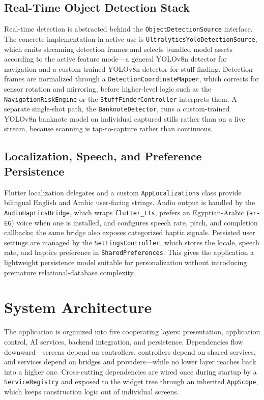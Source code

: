 \documentclass[12pt,a4paper]{report}
\begin{document}
\subsection{Real-Time Object Detection Stack}
Real-time detection is abstracted behind the \texttt{ObjectDetectionSource} interface. The concrete implementation in active use is \texttt{UltralyticsYoloDetectionSource}, which emits streaming detection frames and selects bundled model assets according to the active feature mode---a general YOLOv8n detector for navigation and a custom-trained YOLOv8n detector for stuff finding. Detection frames are normalized through a \texttt{DetectionCoordinateMapper}, which corrects for sensor rotation and mirroring, before higher-level logic such as the \texttt{NavigationRiskEngine} or the \texttt{StuffFinderController} interprets them. A separate single-shot path, the \texttt{BanknoteDetector}, runs a custom-trained YOLOv8n banknote model on individual captured stills rather than on a live stream, because scanning is tap-to-capture rather than continuous.

\subsection{Localization, Speech, and Preference Persistence}
Flutter localization delegates and a custom \texttt{AppLocalizations} class provide bilingual English and Arabic user-facing strings. Audio output is handled by the \texttt{AudioHapticsBridge}, which wraps \texttt{flutter\_tts}, prefers an Egyptian-Arabic (\texttt{ar-EG}) voice when one is installed, and configures speech rate, pitch, and completion callbacks; the same bridge also exposes categorized haptic signals. Persisted user settings are managed by the \texttt{SettingsController}, which stores the locale, speech rate, and haptics preference in \texttt{SharedPreferences}. This gives the application a lightweight persistence model suitable for personalization without introducing premature relational-database complexity.

\section{System Architecture}
The application is organized into five cooperating layers: presentation, application control, AI services, backend integration, and persistence. Dependencies flow downward---screens depend on controllers, controllers depend on shared services, and services depend on bridges and providers---while no lower layer reaches back into a higher one. Cross-cutting dependencies are wired once during startup by a \texttt{ServiceRegistry} and exposed to the widget tree through an inherited \texttt{AppScope}, which keeps construction logic out of individual screens.
\end{document}
